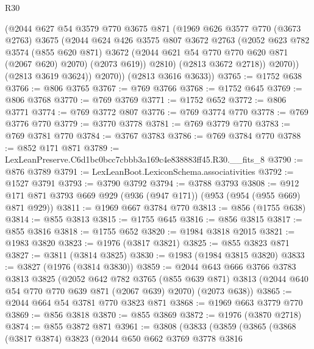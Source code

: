 \begin{lexlean}{R30}
\begin{coremodule}
              (@2044
                @627
                @54
                @3579
                @770
                @3675
                @871
                (@1969
                  @626
                  @3577
                  @770
                  (@3673 @2763)
                  @3675
                  (@2044
                    @624
                    @426
                    @3575
                    @807
                    @3672
                    @2763
                    (@2052
                      @623
                      @782
                      @3574
                      (@855 @620 @871)
                      @3672
                      (@2044 @621 @54 @770 @770 @620 @871 (@2067 @620) @2070)
                      (@2073 @619))
                    @2810)
                  (@2813 @3672 @2718))
                @2070))
            (@2813 @3619 @3624))
          @2070))
      (@2813 @3616 @3633))
@3765 := @1752 @638
@3766 := @806 @3765
@3767 := @769 @3766
@3768 := @1752 @645
@3769 := @806 @3768
@3770 := @769 @3769
@3771 := @1752 @652
@3772 := @806 @3771
@3774 := @769 @3772 @807
@3776 := @769 @3774 @770
@3778 := @769 @3776 @770
@3779 := @3770 @3778
@3781 := @769 @3779 @770
@3783 := @769 @3781 @770
@3784 := @3767 @3783
@3786 := @769 @3784 @770
@3788 := @852 @171 @871
@3789 := LexLeanPreserve.C6d1bc0bcc7cbbb3a169c4e838883ff45.R30.__fits_8
@3790 := @876 @3789
@3791 := LexLeanBoot.LexiconSchema.associativities
@3792 := @1527 @3791
@3793 := @3790 @3792
@3794 := @3788 @3793
@3808 := @912 @171 @871 @3793 @669 @929 (@936 (@947 @171)) (@953 (@954 (@955 @669) @871 @929))
@3811 := @1969 @667 @3784 @770
@3813 := @856 (@1755 @638)
@3814 := @855 @3813
@3815 := @1755 @645
@3816 := @856 @3815
@3817 := @855 @3816
@3818 := @1755 @652
@3820 := @1984 @3818 @2015
@3821 := @1983 @3820
@3823 := @1976 (@3817 @3821)
@3825 := @855 @3823 @871
@3827 := @3811 (@3814 @3825)
@3830 := @1983 (@1984 @3815 @3820)
@3833 := @3827 (@1976 (@3814 @3830))
@3859 := @2044
    @643
    @666
    @3766
    @3783
    @3813
    @3825
    (@2052
      @642
      @782
      @3765
      (@855 @639 @871)
      @3813
      (@2044 @640 @54 @770 @770 @639 @871 (@2067 @639) @2070)
      (@2073 @638))
@3865 := @2044 @664 @54 @3781 @770 @3823 @871
@3868 := @1969 @663 @3779 @770
@3869 := @856 @3818
@3870 := @855 @3869
@3872 := @1976 (@3870 @2718)
@3874 := @855 @3872 @871
@3961 := @3808
    (@3833
      (@3859
        (@3865
          (@3868
            (@3817 @3874)
            @3823
            (@2044
              @650
              @662
              @3769
              @3778
              @3816

\end{coremodule}
\end{lexlean}
